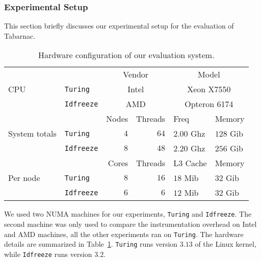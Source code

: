 
\subsubsection{Experimental Setup}

This section briefly discusses our experimental setup for the evaluation of \gls{Tabarnac}.

\begin{table}[htb]
    \centering
    \begin{tabular}{lp{1.1cm}rrp{1.35cm}p{1.1cm}}
        \toprule
        \multirow{3}{.8cm}{CPU}
        &  & \multicolumn{2}{c}{Vendor} & \multicolumn{2}{c}{Model} \\
        \cmidrule(lr){3-6}
        & \texttt{Turing}  & \multicolumn{2}{c}{Intel} & \multicolumn{2}{c}{Xeon X7550} \\
        & \texttt{Idfreeze} & \multicolumn{2}{c}{AMD} & \multicolumn{2}{c}{Opteron 6174} \\
        \midrule
        \midrule
        \multirow{3}{.8cm}{System totals}
        & & Nodes & Threads & Freq & Memory \\
        \cmidrule(lr){3-6}
        & \texttt{Turing}   & $4$ & $64$ & $2.00$ Ghz & $128$ Gib \\
        & \texttt{Idfreeze} & $8$ & $48$ & $2.20$ Ghz & $256$ Gib\\
        \midrule
        \midrule
        \multirow{3}{.8cm}{Per node}
        & & Cores & Threads & L3 Cache & Memory \\
        \cmidrule(lr){3-6}
        & \texttt{Turing}   & $8$ & $16$ & $18$ Mib & $32$ Gib \\
        & \texttt{Idfreeze} & $6$ & $6$  & $12$ Mib & $32$ Gib \\
        \bottomrule
    \end{tabular}
    \caption{Hardware configuration of our evaluation system.}
    \label{tab:hw}
\end{table}

We used two NUMA machines for our experiments, \texttt{Turing} and
\texttt{Idfreeze}. The second machine was only used to compare the
instrumentation overhead on Intel and AMD machines, all the other experiments
ran on \texttt{Turing}. The hardware details are
summarized in Table~\ref{tab:hw}. \texttt{Turing} runs version $3.13$ of the
Linux kernel, while \texttt{Idfreeze} runs version $3.2$.

